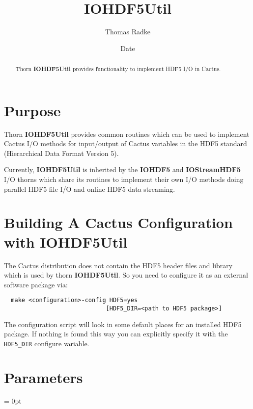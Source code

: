 \documentclass{article}
\newlength{\tableWidth} \newlength{\maxVarWidth} \newlength{\paraWidth} \newlength{\descWidth}
\begin{document}
\title{IOHDF5Util}
\author{Thomas Radke}
\date{$ $Date$ $}

\maketitle


\begin{abstract}
Thorn {\bf IOHDF5Util} provides functionality to implement HDF5 I/O in Cactus.
\end{abstract}

\section{Purpose}
Thorn {\bf IOHDF5Util} provides common routines which can be used to implement
Cactus I/O methods for input/output of Cactus variables in the HDF5 standard
(Hierarchical Data Format Version 5).

Currently, {\bf IOHDF5Util} is inherited by the {\bf IOHDF5} and
{\bf IOStreamHDF5} I/O thorns which share its routines to implement their own
I/O methods doing parallel HDF5 file I/O and online HDF5 data streaming.
%
%
\section{Building A Cactus Configuration with {\bf IOHDF5Util}}
%
The Cactus distribution does not contain the HDF5 header files and library which
is used by thorn {\bf IOHDF5Util}. So you need to configure it as an external
software package via:
%
\begin{verbatim}
  make <configuration>-config HDF5=yes
                             [HDF5_DIR=<path to HDF5 package>]
\end{verbatim}
%
The configuration script will look in some default places for an installed
HDF5 package. If nothing is found this way you can explicitly specify it with
the {\tt HDF5\_DIR} configure variable.




\section{Parameters} 


\parskip = 0pt

\setlength{\tableWidth}{160mm}
\end{document}
